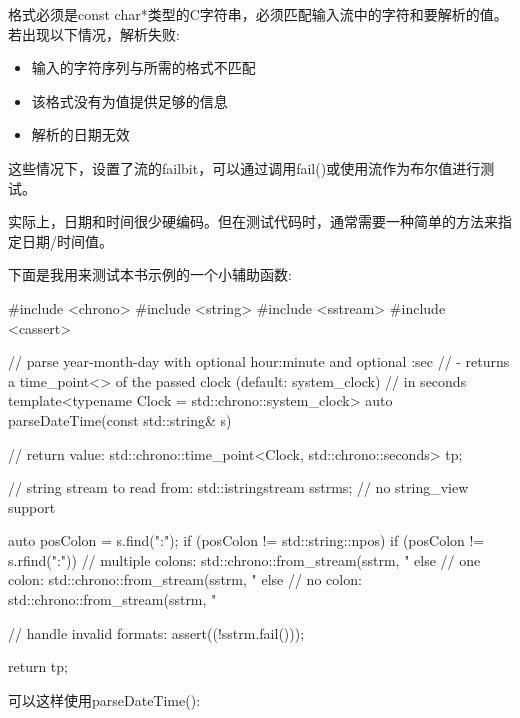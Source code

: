 格式必须是const char*类型的C字符串，必须匹配输入流中的字符和要解析的值。若出现以下情况，解析失败:

\begin{itemize}
\item
输入的字符序列与所需的格式不匹配

\item
该格式没有为值提供足够的信息

\item
解析的日期无效
\end{itemize}

这些情况下，设置了流的failbit，可以通过调用fail()或使用流作为布尔值进行测试。


实际上，日期和时间很少硬编码。但在测试代码时，通常需要一种简单的方法来指定日期/时间值。

下面是我用来测试本书示例的一个小辅助函数:


\begin{cpp}
#include <chrono>
#include <string>
#include <sstream>
#include <cassert>

// parse year-month-day with optional hour:minute and optional :sec
// - returns a time_point<> of the passed clock (default: system_clock)
// in seconds
template<typename Clock = std::chrono::system_clock>
auto parseDateTime(const std::string& s)
{
	// return value:
	std::chrono::time_point<Clock, std::chrono::seconds> tp;

	// string stream to read from:
	std::istringstream sstrm{s}; // no string_view support

	auto posColon = s.find(":");
	if (posColon != std::string::npos) {
		if (posColon != s.rfind(":")) {
			// multiple colons:
			std::chrono::from_stream(sstrm, "%
		}
		else {
			// one colon:
			std::chrono::from_stream(sstrm, "%
		}
	}
	else {
		// no colon:
		std::chrono::from_stream(sstrm, "%
	}

	// handle invalid formats:
	assert((!sstrm.fail()));

	return tp;
}
\end{cpp}

可以这样使用parseDateTime():



